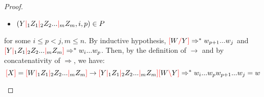 \documentclass[12pt]{extarticle}
\theoremstyle{definition} \newtheorem{defn}{Definition}
\theoremstyle{definition} \newtheorem{prop}{Proposition}
\theoremstyle{definition} \newtheorem{property}{Property}
\newcommand{\lc}{\textcolor{red}{\backslash}}
\newcommand{\rc}{\textcolor{red}{/}}
\newcommand{\mc}{\textcolor{red}{|}}
\newcommand{\lb}{\textcolor{red}{[}}
\newcommand{\rb}{\textcolor{red}{]}}
\begin{document}
\begin{proof}
\begin{enumerate}
\begin{itemize}
                \item $(Y \mc_1 Z_1 \mc_2 Z_2 ... \mc_m Z_m, i, p) \in P$
            \end{itemize}
            for some $i \leq p < j, m \leq n$. By inductive hypothesis,
            $\lb W \rc Y \rb \Rightarrow^* w_{p + 1} ... w_j$
            and
            $\lb Y \mc_1 Z_1 \mc_2 Z_2 ... \mc_m Z_m \rb \Rightarrow^* w_i ... w_p$.
            Then, by the definition of $\rightarrow$ and by concatenativity of
            $\Rightarrow$, we have:
            \[
                \lb X \rb = \lb W \mc_1 Z_1 \mc_2 Z_2 ... \mc_m Z_m \rb
                \rightarrow
                \lb Y \mc_1 Z_1 \mc_2 Z_2 ... \mc_m Z_m \rb \lb W \lc Y \rb
                \Rightarrow^*
                w_i ... w_p w_{p + 1} ... w_j = w
            \]
    \end{enumerate}
\end{proof}
\end{document}
